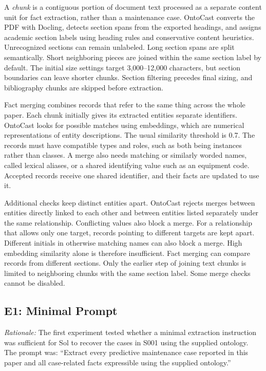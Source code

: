 \documentclass[journal]{IEEEtran}
\newcommand{\minimalPrompt}{Extract every predictive maintenance case reported in this paper and all case-related facts expressible using the supplied ontology.}
\begin{document}
A \emph{chunk} is a contiguous portion of document text processed as a separate content unit for fact extraction, rather than a maintenance case. OntoCast converts the PDF with Docling, detects section spans from the exported headings, and assigns academic section labels using heading rules and conservative content heuristics. Unrecognized sections can remain unlabeled. Long section spans are split semantically. Short neighboring pieces are joined within the same section label by default. The initial size settings target 3,000--12,000 characters, but section boundaries can leave shorter chunks. Section filtering precedes final sizing, and bibliography chunks are skipped before extraction.

Fact merging combines records that refer to the same thing across the whole paper. Each chunk initially gives its extracted entities separate identifiers. OntoCast looks for possible matches using embeddings, which are numerical representations of entity descriptions. The usual similarity threshold is 0.7. The records must have compatible types and roles, such as both being instances rather than classes. A merge also needs matching or similarly worded names, called lexical aliases, or a shared identifying value such as an equipment code. Accepted records receive one shared identifier, and their facts are updated to use it.

Additional checks keep distinct entities apart. OntoCast rejects merges between entities directly linked to each other and between entities listed separately under the same relationship. Conflicting values also block a merge. For a relationship that allows only one target, records pointing to different targets are kept apart. Different initials in otherwise matching names can also block a merge. High embedding similarity alone is therefore insufficient. Fact merging can compare records from different sections. Only the earlier step of joining text chunks is limited to neighboring chunks with the same section label. Some merge checks cannot be disabled.

\subsection{E1: Minimal Prompt}
\label{exp:minimal}

\emph{Rationale:} The first experiment tested whether a minimal extraction instruction was sufficient for Sol to recover the cases in S001 using the supplied ontology. The prompt was: ``\minimalPrompt''
\end{document}
